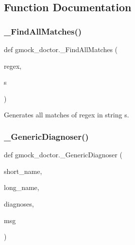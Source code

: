 \subsection{Function Documentation}
\mbox{\label{namespacegmock__doctor_af9f6b7d876afcfe52864f2b928f5e6ab}} 
\subsubsection{\texorpdfstring{\_FindAllMatches()}{\_FindAllMatches()}}
{\footnotesize\ttfamily def gmock\+\_\+doctor.\+\_\+\+Find\+All\+Matches (\begin{DoxyParamCaption}\item[{}]{regex,  }\item[{}]{s }\end{DoxyParamCaption})\hspace{0.3cm}{\ttfamily [private]}}

\begin{DoxyVerb}Generates all matches of regex in string s.\end{DoxyVerb}
 \mbox{\label{namespacegmock__doctor_af5023d3e12d1f4a7171c6b035783de84}} 
\subsubsection{\texorpdfstring{\_GenericDiagnoser()}{\_GenericDiagnoser()}}
{\footnotesize\ttfamily def gmock\+\_\+doctor.\+\_\+\+Generic\+Diagnoser (\begin{DoxyParamCaption}\item[{}]{short\+\_\+name,  }\item[{}]{long\+\_\+name,  }\item[{}]{diagnoses,  }\item[{}]{msg }\end{DoxyParamCaption})\hspace{0.3cm}{\ttfamily [private]}}

